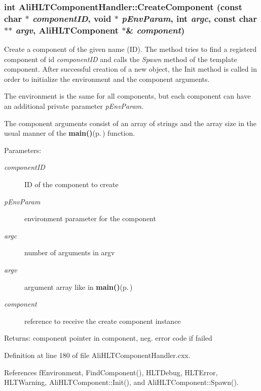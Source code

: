 \subsubsection{\setlength{\rightskip}{0pt plus 5cm}int Ali\-HLTComponent\-Handler::Create\-Component (const char $\ast$ {\em component\-ID}, void $\ast$ {\em p\-Env\-Param}, int {\em argc}, const char $\ast$$\ast$ {\em argv}, {\bf Ali\-HLTComponent} $\ast$\& {\em component})}\label{classAliHLTComponentHandler_a15}


Create a component of the given name (ID). The method tries to find a registerd component of id {\em component\-ID\/} and calls the {\em Spawn\/} method of the template component. After successful creation of a new object, the Init method is called in order to initialize the environment and the component arguments. \par
 The environment is the same for all components, but each component can have an additional private parameter {\em p\-Env\-Param\/}.\par
 The component arguments consist of an array of strings and the array size in the usual manner of the {\bf main()}{\rm (p.\,\pageref{PeakFinderTest_8cxx_a1})} function. \begin{Desc}
\item[Parameters:]
\begin{description}
\item[{\em component\-ID}]ID of the component to create \item[{\em p\-Env\-Param}]environment parameter for the component \item[{\em argc}]number of arguments in argv \item[{\em argv}]argument array like in {\bf main()}{\rm (p.\,\pageref{PeakFinderTest_8cxx_a1})} \item[{\em component}]reference to receive the create component instance \end{description}
\end{Desc}
\begin{Desc}
\item[Returns:]component pointer in component, neg. error code if failed \end{Desc}


Definition at line 180 of file Ali\-HLTComponent\-Handler.cxx.

References f\-Environment, Find\-Component(), HLTDebug, HLTError, HLTWarning, Ali\-HLTComponent::Init(), and Ali\-HLTComponent::Spawn().

